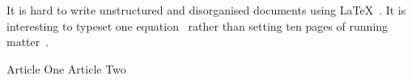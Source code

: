 \documentclass{article}
\begin{document}
It is hard to write unstructured and disorganised documents using
\LaTeX~\cite{key1}. It is interesting to typeset one
equation~\cite[Sec 3.3]{key2} rather than setting ten pages of
running matter~\cite{key1,key2}.

\begin{thebibliography}{9}
  Article One
  Article Two
\end{thebibliography}
\end{document}
